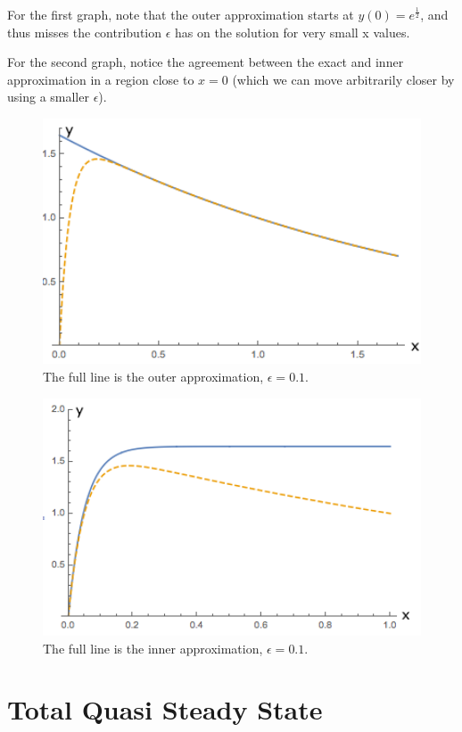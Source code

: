 \documentclass[12pt]{article}
\begin{document}
For the first graph, note that the outer approximation starts at
$y(0)=e^{\frac{1}{2}}$, and thus misses the contribution $\epsilon$
has on the solution for very small x values.

For the second graph, notice the agreement between the exact and inner
approximation in a region close to $x=0$ (which we can move
arbitrarily closer by using a smaller $\epsilon$).

\newpage
\begin{figure}[ht!]
\centering
\includegraphics[width=120mm]
{tmp_ode-outer_axis.png}
\caption{The full line is the outer approximation, $\epsilon=0.1$.}
\label{overflow}
\end{figure}

\begin{figure}[ht!]
\centering
\includegraphics[width=120mm]
{tmp_ode-inner_axis.png}
\caption{The full line is the inner approximation, $\epsilon=0.1$.}
\label{overflow}
\end{figure}

\section{Total Quasi Steady State}
\end{document}
